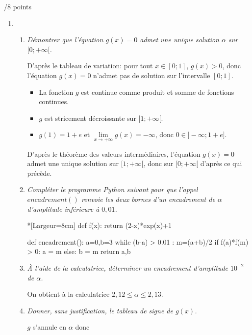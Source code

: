 \documentclass[a4paper]{article}
\begin{document}
\begin{exerciceinterro}{\hspace{2cm}/8 points}{}
\begin{enumerate}
\begin{enumerate}
	\end{enumerate}	
	\item \begin{enumerate}
		\item \textit{Démontrer que l'équation $g(x)=0$ admet une unique solution $\alpha$ sur $[0;+\infty[$.}

		D'après le tableau de variation: pour tout $x\in[0;1]$, $g(x)>0$, donc l'équation $g(x)=0$ n'admet pas de solution sur l'intervalle $[0;1]$.

		\begin{itemize}
			\item La fonction $g$ est continue comme produit et somme de fonctions continues.
			\item  $g$ est stricement décroissante sur $[1;+\infty[$.
			\item $g(1)=1+e$ et $\lim\limits_{x \to +\infty} g(x)=-\infty$, donc $0\in]-\infty;1+e]$.
		\end{itemize}

		D'après le théorème des valeurs intermédiaires, l'équation $g(x)=0$ admet une unique solution sur $[1;+\infty[$, donc sur $[0;+\infty[$ d'après ce qui précède.
		
		\item \textit{Compléter le programme Python suivant pour que l'appel $encadrement()$ renvoie les deux bornes d'un 
		encadrement de $\alpha$ d'amplitude inférieure à $0,01$.}
\begin{center}
\begin{CodePythonLst}*[Largeur=8cm]{}
def f(x):
    return (2-x)*exp(x)+1

def encadrement():
    a=0,b=3	
    while (b-a) > 0.01 :
        m=(a+b)/2
        if f(a)*f(m) > 0:
            a = m
        else:
            b = m
    return a,b
\end{CodePythonLst}
\end{center}

\item \textit{\`A l'aide de la calculatrice, déterminer un encadrement d'amplitude $10^{-2}$ de $\alpha$.}

On obtient à la calculatrice $2,12 \leqslant \alpha \leqslant 2,13$.

\item \textit{Donner, sans justification, le tableau de signe de $g(x)$.}

$g$ s'annule en $\alpha$ donc 

\begin{center}
	\end{center}



\end{enumerate}
\end{enumerate}
\end{exerciceinterro}
\end{document}
